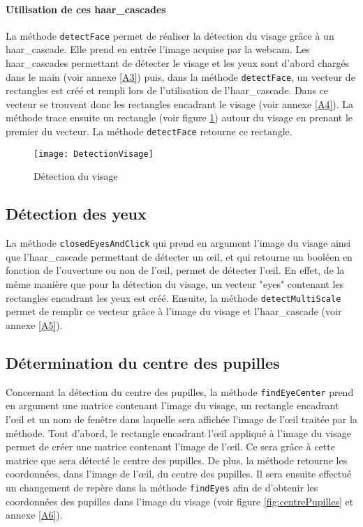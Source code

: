 \paragraph{Utilisation de ces haar\_cascades}

La méthode \lstinline=detectFace= permet de réaliser la détection du visage grâce à un haar\_cascade. Elle prend en entrée l’image acquise par la webcam. Les haar\_cascades permettant de détecter le visage et les yeux sont d’abord chargés dans le main (voir annexe \ref{A3}) puis, dans la méthode \lstinline=detectFace=, un vecteur de rectangles est créé et rempli lors de l’utilisation de l’haar\_cascade. Dans ce vecteur se trouvent donc les rectangles encadrant le visage (voir annexe \ref{A4}). La méthode trace ensuite un rectangle (voir figure \ref{fig:DetectionVisage}) autour du visage en prenant le premier du vecteur. La méthode \lstinline=detectFace= retourne ce rectangle.

\begin{figure}[H]
  \centering
  \texttt{[image: DetectionVisage]}
  \caption{Détection du visage}
  \label{fig:DetectionVisage}
\end{figure}

\subsection{Détection des yeux}

La méthode \lstinline=closedEyesAndClick= qui prend en argument l’image du visage ainsi que l’haar\_cascade permettant de détecter un œil, et qui retourne un booléen en fonction de l’ouverture ou non de l’œil, permet de détecter l’œil. En effet, de la même manière que pour la détection du visage, un vecteur "eyes" contenant les rectangles encadrant les yeux est créé. Ensuite, la méthode \lstinline=detectMultiScale= permet de remplir ce vecteur grâce à l’image du visage et l’haar\_cascade (voir annexe \ref{A5}).

\subsection{Détermination du centre des pupilles}

Concernant la détection du centre des pupilles, la méthode \lstinline=findEyeCenter= prend en argument une matrice contenant l’image du visage, un rectangle encadrant l’œil et un nom de fenêtre dans laquelle sera affichée l’image de l’œil traitée par la méthode. Tout d’abord, le rectangle encadrant l’œil appliqué à l’image du visage permet de créer une matrice contenant l’image de l’œil. Ce sera grâce à cette matrice que sera détecté le centre des pupilles. De plus, la méthode retourne les coordonnées, dans l’image de l’œil, du centre des pupilles. Il sera ensuite effectué un changement de repère dans la méthode \lstinline=findEyes= afin de d’obtenir les coordonnées des pupilles dans l’image du visage (voir figure \ref{fig:centrePupilles} et annexe \ref{A6}).

